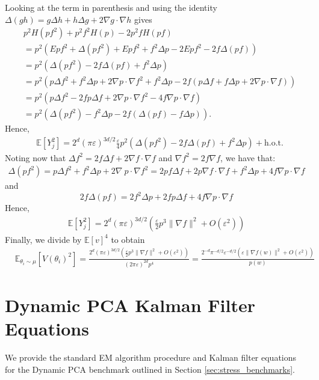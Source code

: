 \documentclass[11pt]{article}
\theoremstyle{plain}
\theoremstyle{definition}
\theoremstyle{remark}
\numberwithin{equation}{section}
\newcommand{\lb}{\left}
\newcommand{\rb}{\right}
\newcommand{\veps}{\varepsilon}
\newcommand{\E}{\mathbb{E}}
\begin{document}
Looking at the term in parenthesis and using the identity $\Delta(gh)=g\Delta h+h\Delta g+2\nabla g\cdot\nabla h$ gives
\begin{align*}
    &p^2H (pf^2)+p^2f^2H(p)-2p^2fH(pf)\\
    &=p^2(E pf^2+\Delta (pf^2)+E p f^2+f^2 \Delta p-2E p f^2-2f\Delta (p f))\\&=p^2(\Delta (pf^2)-2f\Delta (pf)+f^2\Delta p)\\&=p^2(p\Delta f^2+f^2 \Delta p +2 \nabla p \cdot \nabla f^2+f^2 \Delta p-2f(p\Delta f + f \Delta p+2 \nabla p \cdot \nabla f))\\&=p^2(p\Delta f^2-2fp\Delta f + 2\nabla p \cdot \nabla f^2-4f \nabla p \cdot \nabla f)\\&=p^2(\Delta (p f^2)-f^2 \Delta p-2f(\Delta(pf)-f\Delta p)).
\end{align*}
Hence,
\begin{align*}
    &\E[Y_j^2]=2^d (\pi \veps)^{3d/2}\frac{\veps}{4}p^2(\Delta (p f^2)-2f \Delta (pf)+f^2\Delta p)+\textrm{h.o.t.}
\end{align*}
Noting now that $\Delta f^2=2f \Delta f+2 \nabla f \cdot \nabla f$ and $\nabla f^2=2f \nabla f$, we have that:
\begin{align*}
\Delta (p f^2)=p \Delta f^2+f^2 \Delta p+2 \nabla\ p \cdot \nabla f^2=2p f \Delta f+2 p \nabla f \cdot\nabla f +f^2 \Delta p+4f \nabla p \cdot\nabla f
\end{align*}
and 
\[2f\Delta (p f)=2f^2 \Delta p+2 f p \Delta f +4 f \nabla p\cdot \nabla f\]
Hence,
\begin{align*}
\E[Y_j^2]=2^d (\pi \veps)^{3d/2}\lb(\frac{\veps}{2}p^3 \|\nabla f \|^2+O(\veps^2)\rb)
\end{align*}
Finally, we divide by $\E[v]^4$ to obtain
\begin{align*}
    &\E_{\theta_i\sim\mu} [V(\theta_i)^2]=\frac{2^d (\pi \veps)^{3d/2}\lb(\frac{\veps}{2}p^3\|\nabla f\|^2+O(\veps^2)\rb)}{(2\pi \veps)^{2d}p^4}=\frac{2^{-d} \pi^{-d/2} \veps^{-d/2}\lb(\veps\|\nabla f(w)\|^2+O(\veps^2)\rb)}{p(w)}
\end{align*}

\section{Dynamic PCA Kalman Filter Equations}
\label{sec:appd}
\setcounter{table}{0}
\setcounter{figure}{0}
\renewcommand{\thetable}{D.\arabic{table}}
\renewcommand{\thefigure}{D.\arabic{figure}}
We provide the standard EM algorithm procedure and Kalman filter equations for the Dynamic PCA benchmark outlined in Section \ref{sec:stress_benchmarks}.
\end{document}
